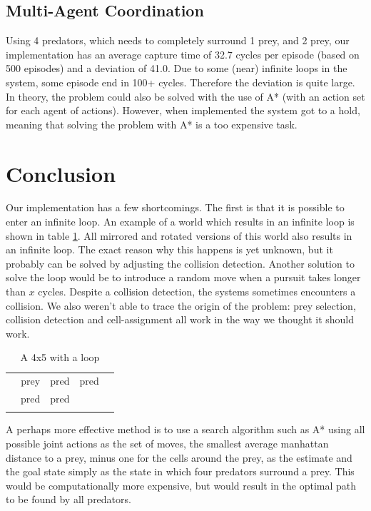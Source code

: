 \documentclass[10pt]{article}
\begin{document}
\subsection{Multi-Agent Coordination}
Using 4 predators, which needs to completely surround 1 prey, and 2 prey, our implementation has an average capture time of 32.7 cycles per episode (based on 500 episodes) and a deviation of 41.0. Due to some (near) infinite loops in the system, some episode end in 100+ cycles. Therefore the deviation is quite large.\\
In theory, the problem could also be solved with the use of A* (with an action set for each agent of  actions). However, when implemented the system got to a hold, meaning that solving the problem with A* is a too expensive task.


\section{Conclusion}\label{conclusion}
%
Our implementation has a few shortcomings. The first is that it is possible to enter an infinite loop. An example of a world which results in an infinite loop is shown in table \ref{tab_loop}. All mirrored and rotated versions of this world also results in an infinite loop. The exact reason why this happens is yet unknown, but it probably can be solved by adjusting the collision detection. Another solution to solve the loop would be to introduce a random move when a pursuit takes longer than $x$ cycles. Despite a collision detection, the systems sometimes encounters a collision. We also weren't able to trace the origin of the problem: prey selection, collision detection and cell-assignment all work in the way we thought it should work. 

\begin{table}[h!tb]
\centering
	\caption{A 4x5 with a loop}
\label{tab_loop}
\begin{tabular}{|c|c|c|c|c|}\hline
	 &  & & & \\ \hline
	 & prey & pred & pred & \\ \hline
	 & pred & pred & & \\ \hline
	 &  & & & \\ \hline
\end{tabular}
\end{table}

A perhaps more effective method is to use a search algorithm such as A* using all possible joint actions as the set of moves, the smallest average manhattan distance to a prey, minus one for the cells around the prey, as the estimate and the goal state simply as the state in which four predators surround a prey. This would be computationally more expensive, but would result in the optimal path to be found by all predators.



 \pagebreak

  
 
 \pagebreak
 \appendix
\end{document}
